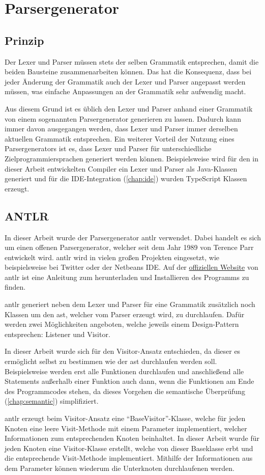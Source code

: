 \section{Parsergenerator}
\subsection{Prinzip}
Der Lexer und Parser müssen stets der selben Grammatik entsprechen, damit die beiden Bausteine zusammenarbeiten können. Das hat die Konsequenz, dass bei jeder Änderung der Grammatik auch der Lexer und Parser angepasst werden müssen, was einfache Anpassungen an der Grammatik sehr aufwendig macht.

Aus diesem Grund ist es üblich den Lexer und Parser anhand einer Grammatik von einem sogenannten Parsergenerator generieren zu lassen. Dadurch kann immer davon ausgegangen werden, dass Lexer und Parser immer derselben aktuellen Grammatik entsprechen. Ein weiterer Vorteil der Nutzung eines Parsergenerators ist es, dass Lexer und Parser für unterschiedliche Zielprogrammiersprachen generiert werden können. Beispielsweise wird für den in dieser Arbeit entwickelten Compiler ein Lexer und Parser als Java-Klassen generiert und für die IDE-Integration (\cref{chap:ide})  wurden TypeScript Klassen erzeugt.  

\subsection{ANTLR}
In dieser Arbeit wurde der Parsergenerator \ac{antlr} verwendet. Dabei handelt es sich um einen offenen Parsergenerator, welcher seit dem Jahr 1989 von Terence Parr entwickelt wird. \ac{antlr} wird in vielen großen Projekten eingesetzt, wie beispielsweise bei Twitter oder der Netbeans IDE. \cite{TerenceParr2022} Auf der \href{}{offiziellen Website} von \ac{antlr} ist eine Anleitung zum herunterladen und Installieren des Programms zu finden. 

\ac{antlr} generiert neben dem Lexer und Parser für eine Grammatik zusätzlich noch Klassen um den \ac{ast}, welcher vom Parser erzeugt wird, zu durchlaufen. Dafür werden zwei Möglichkeiten angeboten, welche jeweils einem Design-Pattern entsprechen: Listener und Visitor.

In dieser Arbeit wurde sich für den Visitor-Ansatz entschieden, da dieser es ermöglicht selbst zu bestimmen wie der \ac{ast} durchlaufen werden soll. Beispielsweise werden erst alle Funktionen durchlaufen und anschließend alle Statements außerhalb einer Funktion auch dann, wenn die Funktionen am Ende des Programmcodes stehen, da dieses Vorgehen die semantische Überprüfung (\cref{chap:semantic}) simplifiziert.

\ac{antlr} erzeugt beim Visitor-Ansatz eine \enquote{BaseVisitor}-Klasse, welche für jeden Knoten eine leere Visit-Methode mit einem Parameter implementiert, welcher Informationen zum entsprechenden Knoten beinhaltet. In dieser Arbeit wurde für jeden Knoten eine Visitor-Klasse erstellt, welche von dieser Baseklasse erbt und die entsprechende Visit-Methode implementiert. Mithilfe der Informationen aus dem Parameter können wiederum die Unterknoten durchlaufenen werden.



